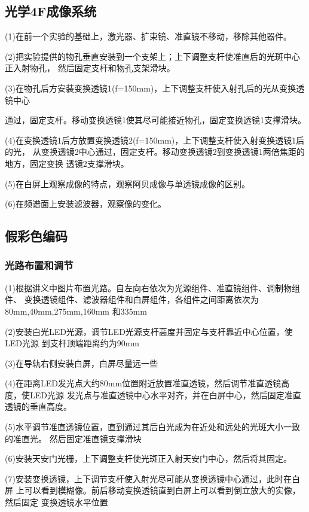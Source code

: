 \documentclass[12pt,a4paper]{article}
\begin{document}
    \subsection{光学4F成像系统}
        (1)在前一个实验的基础上，激光器、扩束镜、准直镜不移动，移除其他器件。\par
        (2)把实验提供的物孔垂直安装到一个支架上；上下调整支杆使准直后的光斑中心正入射物孔，
        然后固定支杆和物孔支架滑块。\par
        (3)在物孔后方安装变换透镜1(f=150mm)，上下调整支杆使入射孔后的光从变换透镜中心\par
        通过，固定支杆。移动变换透镜1使其尽可能接近物孔，固定变换透镜1支撑滑块。\par
        (4)在变换透镜1后方放置变换透镜2(f=150mm)，上下调整支杆使入射变换透镜1后的光，
        从变换透镜2中心通过，固定支杆。移动变换透镜2到变换透镜1两倍焦距的地方，固定变换
        透镜2支撑滑块。\par
        (5)在白屏上观察成像的特点，观察阿贝成像与单透镜成像的区别。\par
        (6)在频谱面上安装滤波器，观察像的变化。

    \subsection{假彩色编码}
        \subsubsection{光路布置和调节}
            (1)根据讲义中图片布置光路。自左向右依次为光源组件、准直镜组件、调制物组件、
            变换透镜组件、滤波器组件和白屏组件，各组件之间距离依次为80mm,40mm,275mm,160mm
            和335mm\par
            (2)安装白光LED光源，调节LED光源支杆高度并固定与支杆靠近中心位置，使LED光源
            到支杆顶端距离约为90mm\par
            (3)在导轨右侧安装白屏，白屏尽量远一些\par
            (4)在距离LED发光点大约80mm位置附近放置准直透镜，然后调节准直透镜高度，使LED光源
            发光点与准直透镜中心水平对齐，并在白屏中心，然后固定准直透镜的垂直高度。\par
            (5)水平调节准直透镜位置，直到通过其后白光成为在近处和远处的光斑大小一致的准直光。
            然后固定准直镜支撑滑块\par
            (6)安装天安门光栅，上下调整支杆使光斑正入射天安门中心，然后将其固定。\par
            (7)安装变换透镜，上下调节支杆使入射光尽可能从变换透镜中心通过，此时在白屏
            上可以看到模糊像。前后移动变换透镜直到白屏上可以看到倒立放大的实像，然后固定
            变换透镜水平位置\par
\end{document}
